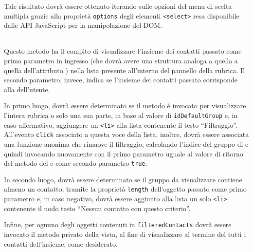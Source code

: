 \begin{description}
Tale risultato dovrà essere ottenuto iterando sulle opzioni del menu di scelta multipla grazie alla proprietà \verb'options' degli elementi \verb'<select>' resa disponibile dalle API JavaScript per la manipolazione del DOM\@.

\item{}\\
Questo metodo ha il compito di visualizzare l'insieme dei contatti passato come primo parametro in ingresso (che dovrà avere una struttura analoga a quella a quella dell'attributo ) nella lista presente all'interno del pannello della rubrica. Il secondo parametro, invece, indica se l'insieme dei contatti passato corrisponde alla  dell'utente.

In primo luogo, dovrà essere determinato se il metodo è invocato per visualizzare l'intera rubrica o solo una sua parte, in base al valore di \verb'idDefaultGroup' e, in caso affermativo, aggiungere un \verb'<li>' alla lista contenente il testo ``Filtraggio''. All'evento \verb'click' associato a questa voce della lista, inoltre, dovrà essere associata una funzione anonima che rimuove il filtraggio, calcolando l'indice del gruppo di  e quindi invocando nuovamente  con il primo parametro uguale al valore di ritorno del metodo  del  e come secondo parametro \verb'true'.

In secondo luogo, dovrà essere determinato se il gruppo da visualizzare contiene almeno un contatto, tramite la proprietà \verb'length' dell'oggetto passato come primo parametro e, in caso negativo, dovrà essere aggiunto alla lista un solo \verb'<li>' contenente il nodo testo ``Nessun contatto con questo criterio''.

Infine, per ognuno degli oggetti contenuti in \verb'filteredContacts' dovrà essere invocato il metodo privato  della vista, al fine di visualizzare al termine del  tutti i contatti dell'insieme, come desiderato.

\end{description}

